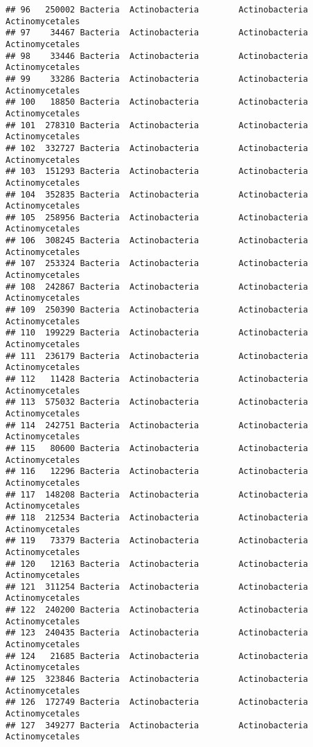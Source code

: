 \documentclass[
]{article}
\begin{document}
\begin{verbatim}
## 96   250002 Bacteria  Actinobacteria        Actinobacteria     Actinomycetales
## 97    34467 Bacteria  Actinobacteria        Actinobacteria     Actinomycetales
## 98    33446 Bacteria  Actinobacteria        Actinobacteria     Actinomycetales
## 99    33286 Bacteria  Actinobacteria        Actinobacteria     Actinomycetales
## 100   18850 Bacteria  Actinobacteria        Actinobacteria     Actinomycetales
## 101  278310 Bacteria  Actinobacteria        Actinobacteria     Actinomycetales
## 102  332727 Bacteria  Actinobacteria        Actinobacteria     Actinomycetales
## 103  151293 Bacteria  Actinobacteria        Actinobacteria     Actinomycetales
## 104  352835 Bacteria  Actinobacteria        Actinobacteria     Actinomycetales
## 105  258956 Bacteria  Actinobacteria        Actinobacteria     Actinomycetales
## 106  308245 Bacteria  Actinobacteria        Actinobacteria     Actinomycetales
## 107  253324 Bacteria  Actinobacteria        Actinobacteria     Actinomycetales
## 108  242867 Bacteria  Actinobacteria        Actinobacteria     Actinomycetales
## 109  250390 Bacteria  Actinobacteria        Actinobacteria     Actinomycetales
## 110  199229 Bacteria  Actinobacteria        Actinobacteria     Actinomycetales
## 111  236179 Bacteria  Actinobacteria        Actinobacteria     Actinomycetales
## 112   11428 Bacteria  Actinobacteria        Actinobacteria     Actinomycetales
## 113  575032 Bacteria  Actinobacteria        Actinobacteria     Actinomycetales
## 114  242751 Bacteria  Actinobacteria        Actinobacteria     Actinomycetales
## 115   80600 Bacteria  Actinobacteria        Actinobacteria     Actinomycetales
## 116   12296 Bacteria  Actinobacteria        Actinobacteria     Actinomycetales
## 117  148208 Bacteria  Actinobacteria        Actinobacteria     Actinomycetales
## 118  212534 Bacteria  Actinobacteria        Actinobacteria     Actinomycetales
## 119   73379 Bacteria  Actinobacteria        Actinobacteria     Actinomycetales
## 120   12163 Bacteria  Actinobacteria        Actinobacteria     Actinomycetales
## 121  311254 Bacteria  Actinobacteria        Actinobacteria     Actinomycetales
## 122  240200 Bacteria  Actinobacteria        Actinobacteria     Actinomycetales
## 123  240435 Bacteria  Actinobacteria        Actinobacteria     Actinomycetales
## 124   21685 Bacteria  Actinobacteria        Actinobacteria     Actinomycetales
## 125  323846 Bacteria  Actinobacteria        Actinobacteria     Actinomycetales
## 126  172749 Bacteria  Actinobacteria        Actinobacteria     Actinomycetales
## 127  349277 Bacteria  Actinobacteria        Actinobacteria     Actinomycetales

\end{verbatim}
\end{document}

